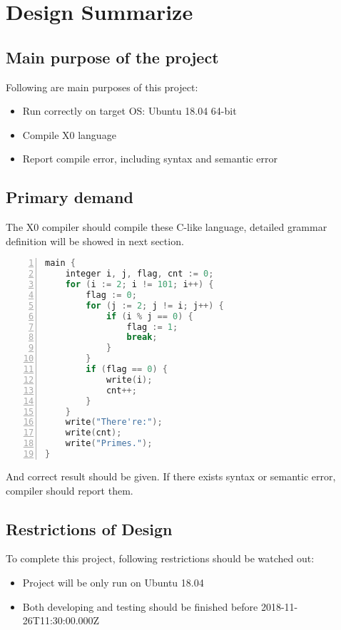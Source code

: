 \documentclass{article}
\begin{document}
		\section{Design Summarize}
		\subsection{Main purpose of the project}
		Following are main purposes of this project:
		\begin{itemize}
		\item Run correctly on target OS: Ubuntu 18.04 64-bit
		\item Compile X0 language
		\item Report compile error, including syntax and semantic error 
		\end{itemize}
		\subsection{Primary demand}
		The X0 compiler should compile these C-like language, detailed grammar definition will be showed in next section.
		\begin{lstlisting}[language={C},numbers=left,numberstyle=\tiny,%frame=shadowbox,  
   rulesepcolor=\color{red!20!green!20!blue!20},  
   keywordstyle=\color{blue!70!black},  
   commentstyle=\color{blue!90!},  
   basicstyle=\ttfamily]  
main {
	integer i, j, flag, cnt := 0;
	for (i := 2; i != 101; i++) {
		flag := 0;
		for (j := 2; j != i; j++) { 
			if (i % j == 0) {
				flag := 1;
				break;
			}
		}
		if (flag == 0) {
			write(i);
			cnt++;
		}
	}
	write("There're:");
	write(cnt);
	write("Primes.");
}
\end{lstlisting}
		And correct result should be given. If there exists syntax or semantic error, compiler should report them.
		\subsection{Restrictions of Design}
		To complete this project, following restrictions should be watched out:
		\begin{itemize}
		\item Project will be only run on Ubuntu 18.04
		\item Both developing and testing should be finished before 2018-11-26T11:30:00.000Z
		\end{itemize}
\end{document}
